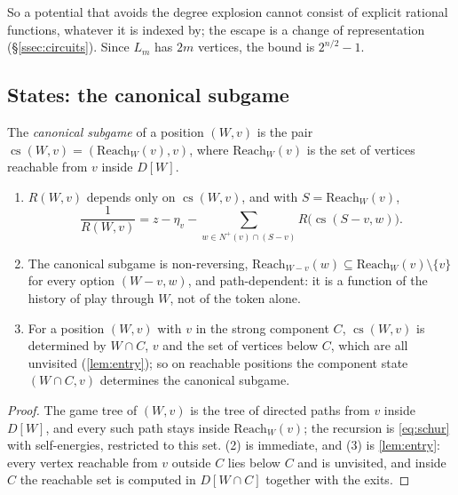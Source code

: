 \documentclass[final]{siamart0516}
\numberwithin{theorem}{section}
\numberwithin{equation}{section}
\theoremstyle{siamnonum}
\theoremstyle{plain}
\newcommand{\nplus}{N^{+}}
\begin{document}
So a potential that avoids the degree explosion cannot consist of explicit rational functions, whatever it is indexed by; the escape is a change of representation (\S\ref{ssec:circuits}). Since $L_m$ has $2m$ vertices, the bound is $2^{n/2}-1$.

\subsection{States: the canonical subgame}\label{ssec:canonical}

\begin{definition}\label{def:canonical}
The \emph{canonical subgame} of a position $(W,v)$ is the pair $\operatorname{cs}(W,v)=(\mathrm{Reach}_W(v),v)$, where $\mathrm{Reach}_W(v)$ is the set of vertices reachable from $v$ inside $D[W]$.
\end{definition}

\begin{lemma}\label{lem:canonical}
\begin{enumerate}[label=\textup{(\arabic*)}]
\item $R(W,v)$ depends only on $\operatorname{cs}(W,v)$, and with $S=\mathrm{Reach}_W(v)$,
\[
\frac1{R(W,v)}=z-\eta_v-\sum_{w\in\nplus(v)\cap(S-v)}R\bigl(\operatorname{cs}(S-v,w)\bigr).
\]
\item The canonical subgame is non-reversing, $\mathrm{Reach}_{W-v}(w)\subseteq\mathrm{Reach}_W(v)\setminus\{v\}$ for every option $(W-v,w)$, and path-dependent: it is a function of the history of play through $W$, not of the token alone.
\item For a position $(W,v)$ with $v$ in the strong component $C$, $\operatorname{cs}(W,v)$ is determined by $W\cap C$, $v$ and the set of vertices below $C$, which are all unvisited \textup{(}\cref{lem:entry}\textup{)}; so on reachable positions the component state $(W\cap C,v)$ determines the canonical subgame.
\end{enumerate}
\end{lemma}
\begin{proof}
The game tree of $(W,v)$ is the tree of directed paths from $v$ inside $D[W]$, and every such path stays inside $\mathrm{Reach}_W(v)$; the recursion is \eqref{eq:schur} with self-energies, restricted to this set. (2) is immediate, and (3) is \cref{lem:entry}: every vertex reachable from $v$ outside $C$ lies below $C$ and is unvisited, and inside $C$ the reachable set is computed in $D[W\cap C]$ together with the exits.
\end{proof}
\end{document}
